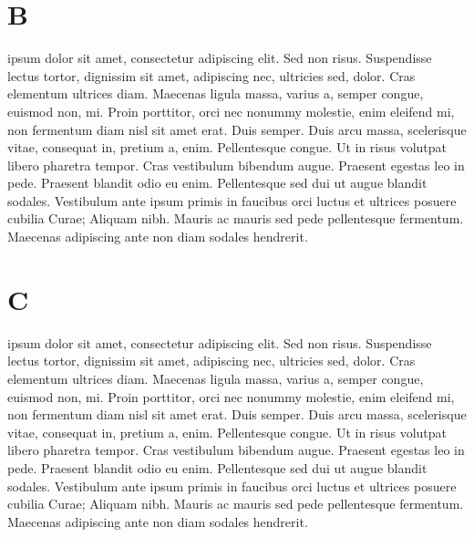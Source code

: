 \documentclass{article}
\begin{document}
\pend


\section{B}



\pstart
{}       ipsum dolor sit amet, consectetur adipiscing elit. Sed non risus. Suspendisse lectus tortor, dignissim sit amet, adipiscing nec, ultricies sed, dolor. Cras elementum ultrices diam. Maecenas ligula massa, varius a, semper congue, euismod non, mi. Proin porttitor, orci nec nonummy molestie, enim  eleifend mi, non fermentum diam nisl sit amet erat. Duis semper. Duis arcu massa, scelerisque vitae, consequat in, pretium a, enim. Pellentesque congue. Ut in risus volutpat libero pharetra tempor. Cras vestibulum bibendum augue. Praesent egestas leo in pede. Praesent blandit odio eu enim. Pellentesque sed dui ut augue blandit sodales. Vestibulum ante ipsum primis in faucibus orci luctus et ultrices posuere cubilia Curae; Aliquam nibh. Mauris ac mauris sed pede pellentesque fermentum. Maecenas adipiscing ante non diam sodales hendrerit. 

\pend


\section{C}



\pstart
{}       ipsum dolor sit amet, consectetur adipiscing elit. Sed non risus. Suspendisse lectus tortor, dignissim sit amet, adipiscing nec, ultricies sed, dolor. Cras elementum ultrices diam. Maecenas ligula massa, varius a, semper congue, euismod non, mi. Proin porttitor, orci nec nonummy molestie, enim  eleifend mi, non fermentum diam nisl sit amet erat. Duis semper. Duis arcu massa, scelerisque vitae, consequat in, pretium a, enim. Pellentesque congue. Ut in risus volutpat libero pharetra tempor. Cras vestibulum bibendum augue. Praesent egestas leo in pede. Praesent blandit odio eu enim. Pellentesque sed dui ut augue blandit sodales. Vestibulum ante ipsum primis in faucibus orci luctus et ultrices posuere cubilia Curae; Aliquam nibh. Mauris ac mauris sed pede pellentesque fermentum. Maecenas adipiscing ante non diam sodales hendrerit. 
\end{document}
